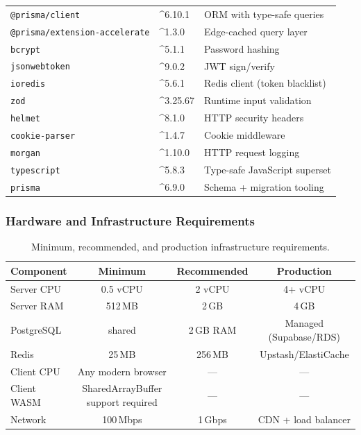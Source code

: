 \begin{table}[H]
\begin{tabular}{llp{6cm}}
    \texttt{@prisma/client}          & \^{}6.10.1 & ORM with type-safe queries \\
    \texttt{@prisma/extension-accelerate} & \^{}1.3.0 & Edge-cached query layer \\
    \texttt{bcrypt}                  & \^{}5.1.1  & Password hashing \\
    \texttt{jsonwebtoken}            & \^{}9.0.2  & JWT sign/verify \\
    \texttt{ioredis}                 & \^{}5.6.1  & Redis client (token blacklist) \\
    \texttt{zod}                     & \^{}3.25.67 & Runtime input validation \\
    \texttt{helmet}                  & \^{}8.1.0  & HTTP security headers \\
    \texttt{cookie-parser}           & \^{}1.4.7  & Cookie middleware \\
    \texttt{morgan}                  & \^{}1.10.0 & HTTP request logging \\
    \texttt{typescript}              & \^{}5.8.3  & Type-safe JavaScript superset \\
    \texttt{prisma}                  & \^{}6.9.0  & Schema + migration tooling \\
    \bottomrule
  \end{tabular}
\end{table}

\subsubsection{Hardware and Infrastructure Requirements}

\begin{table}[H]
  \centering
  \caption{Minimum, recommended, and production infrastructure requirements.}
  \label{tab:hw}
  \begin{tabular}{lccc}
    \toprule
    \textbf{Component} & \textbf{Minimum} & \textbf{Recommended} & \textbf{Production} \\
    \midrule
    Server CPU  & 0.5 vCPU & 2 vCPU & 4+ vCPU \\
    Server RAM  & 512\,MB  & 2\,GB  & 4\,GB \\
    PostgreSQL  & shared   & 2\,GB RAM & Managed (Supabase/RDS) \\
    Redis       & 25\,MB   & 256\,MB & Upstash/ElastiCache \\
    Client CPU  & Any modern browser & --- & --- \\
    Client WASM & SharedArrayBuffer support required & --- & --- \\
    Network     & 100\,Mbps & 1\,Gbps & CDN + load balancer \\
    \bottomrule
  \end{tabular}
\end{table}

